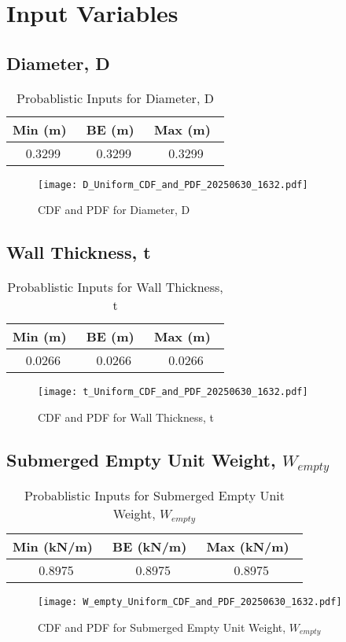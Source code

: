\documentclass{article}
\begin{document}
\section*{Input Variables}

\subsection*{Diameter, D}
\begin{table}[h!]
\centering
\caption{Probablistic Inputs for Diameter, D}
\begin{tabular}{|c|c|c|}
\hline
Min (m)\ & BE (m)\ & Max (m)\ \\
\hline
0.3299 & 0.3299 & 0.3299 \\
\hline
\end{tabular}
\end{table}
\begin{figure}[h!]
\centering
\texttt{[image: D\_Uniform\_CDF\_and\_PDF\_20250630\_1632.pdf]}
\caption{CDF and PDF for Diameter, D}
\end{figure}
\clearpage
\subsection*{Wall Thickness, t}
\begin{table}[h!]
\centering
\caption{Probablistic Inputs for Wall Thickness, t}
\begin{tabular}{|c|c|c|}
\hline
Min (m)\ & BE (m)\ & Max (m)\ \\
\hline
0.0266 & 0.0266 & 0.0266 \\
\hline
\end{tabular}
\end{table}
\begin{figure}[h!]
\centering
\texttt{[image: t\_Uniform\_CDF\_and\_PDF\_20250630\_1632.pdf]}
\caption{CDF and PDF for Wall Thickness, t}
\end{figure}
\clearpage
\subsection*{Submerged Empty Unit Weight, $W_{empty}$}
\begin{table}[h!]
\centering
\caption{Probablistic Inputs for Submerged Empty Unit Weight, $W_{empty}$}
\begin{tabular}{|c|c|c|}
\hline
Min (kN/m)\ & BE (kN/m)\ & Max (kN/m)\ \\
\hline
0.8975 & 0.8975 & 0.8975 \\
\hline
\end{tabular}
\end{table}
\begin{figure}[h!]
\centering
\texttt{[image: W\_empty\_Uniform\_CDF\_and\_PDF\_20250630\_1632.pdf]}
\caption{CDF and PDF for Submerged Empty Unit Weight, $W_{empty}$}
\end{figure}
\clearpage
\end{document}
